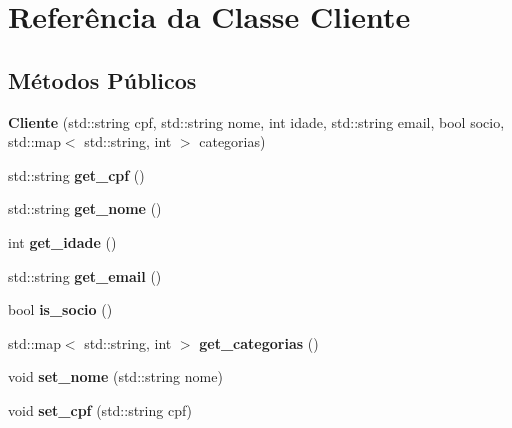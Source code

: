 \hypertarget{class_cliente}{}\section{Referência da Classe Cliente}
\label{class_cliente}
\subsection*{Métodos Públicos}
\begin{DoxyCompactItemize}
\item 
\mbox{\label{class_cliente_acef88712e8df8e5824416e1cb2f0dc90}} 
{\bfseries Cliente} (std\+::string cpf, std\+::string nome, int idade, std\+::string email, bool socio, std\+::map$<$ std\+::string, int $>$ categorias)
\item 
\mbox{\label{class_cliente_a34024580fa30f7d4cc353fef7e99bb7e}} 
std\+::string {\bfseries get\+\_\+cpf} ()
\item 
\mbox{\label{class_cliente_adc90064373e2284ae082a0c3b992a18e}} 
std\+::string {\bfseries get\+\_\+nome} ()
\item 
\mbox{\label{class_cliente_a473bd67382069aaf7ce1ba1a87f62382}} 
int {\bfseries get\+\_\+idade} ()
\item 
\mbox{\label{class_cliente_a2858b6744b07aee4e180d8b441eb5c51}} 
std\+::string {\bfseries get\+\_\+email} ()
\item 
\mbox{\label{class_cliente_ac9c0b9492f85d41e4550129412c26bbe}} 
bool {\bfseries is\+\_\+socio} ()
\item 
\mbox{\label{class_cliente_a59f059460a81ce455585f5ba021f24f6}} 
std\+::map$<$ std\+::string, int $>$ {\bfseries get\+\_\+categorias} ()
\item 
\mbox{\label{class_cliente_a666148cd1cc632a13a15420c4da7e2bd}} 
void {\bfseries set\+\_\+nome} (std\+::string nome)
\item 
\mbox{\label{class_cliente_aa3d5a858d866ba32e70d08b6e4ebab38}} 
void {\bfseries set\+\_\+cpf} (std\+::string cpf)

\end{DoxyCompactItemize}
